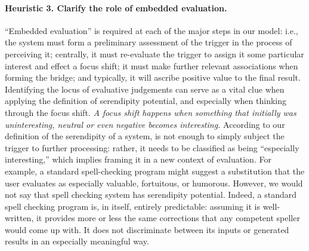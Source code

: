 \paragraph{Heuristic 3. Clarify the role of embedded evaluation.}
\label{heur:3}
``Embedded evaluation'' is required at each of the major steps in our
model: i.e., the system must form a preliminary assessment of
the trigger in the process of perceiving it; centrally, it must
re-evaluate the trigger to assign it some particular interest and
effect a focus shift; it must make further relevant associations when
forming the bridge; and typically, it will ascribe positive value to the final result.
Identifying the locus of evaluative judgements can serve
as a vital clue when applying the definition of serendipity potential, and
especially when thinking through the focus shift.
\emph{A focus shift happens when something that initially was uninteresting, neutral or even negative becomes interesting.}
According to our definition of the serendipity of a system, is not
enough to simply subject the trigger to further processing: rather, it
needs to be classified as being ``especially interesting,'' which
implies framing it in a new context of evaluation.
For example, a standard spell-checking program might suggest a
substitution that the user evaluates as especially valuable, fortuitous,
or humorous.
However, we would not say that spell checking system has serendipity
potential.  Indeed, a standard spell checking program is, in itself, entirely predictable: assuming it is well-written, it provides more or less the same
corrections that any competent speller would come up with.  It does not discriminate
between its inputs or generated results in an especially meaningful way.  


